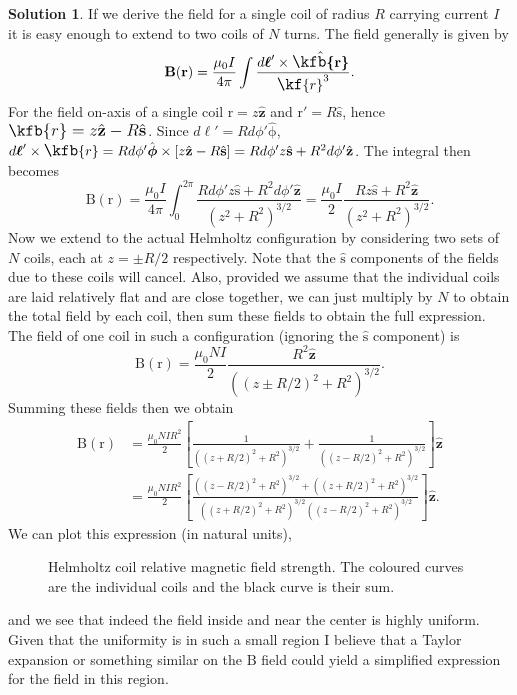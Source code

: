 \documentclass[10pt]{article}
\theoremstyle{definition}
\newtheorem{soln}{Solution}
\newcommand{\uz}{\hat{\mathbf{z}}}
\newcommand{\uv}[1]{\hat{\bv{{#1}}}}
\newcommand{\scriptr}{\fontsize{12pt}{12pt}\kf{r}}
\newcommand{\bscriptr}{\fontsize{12pt}{12pt}\kfb{r}}
\newcommand{\bv}[1]{\bm{\mathrm{#1}}}
\begin{document}
\begin{soln}
  If we derive the field for a single coil of radius $R$ carrying current $I$ it is easy enough to extend to two coils of $N$ turns.
  The field generally is given by
  $$\bv{B}(\bv{r})=\frac{\mu_0 I}{4\pi}\int \frac{d\bv{\ell}'\times\uv{\bscriptr}}{\scriptr^3}.$$
  For the field on-axis of a single coil $\bv{r}=z\uz$ and $\bv{r}'=R\uv{s}$, hence $\bscriptr = z\uz-R\uv{s}$.
  Since $d\bv{\ell}'=Rd\phi'\uv{\phi}$, $d\bv{\ell}'\times {\bscriptr}=Rd\phi'\uv{\phi}\times\left[z\uz-R\uv{s}\right]=
    Rd\phi'z\uv{s}+R^2d\phi'\uz$. The integral then becomes
  $$\bv{B}(\bv{r})=\frac{\mu_0 I}{4\pi}\int_0^{2\pi} \frac{Rd\phi'z\uv{s}+R^2d\phi'\uz}{\left(z^2+R^2\right)^{3/2}}=\frac{\mu_0 I}{2}\frac{Rz\uv{s}+R^2\uz}{\left(z^2+R^2\right)^{3/2}}.$$
  Now we extend to the actual Helmholtz configuration by considering two sets of $N$ coils, each at $z=\pm R/2$ respectively. Note that the $\uv{s}$ components of the
  fields due to these coils will cancel. Also, provided we assume that the individual coils are laid relatively flat and are close together, we can just multiply by $N$
  to obtain the total field by each coil, then sum these fields to obtain the full expression. The field of one coil in such a configuration (ignoring the $\uv{s}$ component) is
  $$\bv{B}(\bv{r})=\frac{\mu_0 NI}{2}\frac{R^2\uz}{\left((z\pm R/2)^2+R^2\right)^{3/2}}.$$
  Summing these fields then we obtain
  \begin{align*}
    \bv{B}(\bv{r}) & =\frac{\mu_0 NIR^2}{2}\left[\frac{1}{\left((z+ R/2)^2+R^2\right)^{3/2}}+\frac{1}{\left((z-R/2)^2+R^2\right)^{3/2}}\right]\uz                                                         \\
                   & =\frac{\mu_0 NIR^2}{2}\left[\frac{\left((z-R/2)^2+R^2\right)^{3/2}+\left((z+ R/2)^2+R^2\right)^{3/2}}{\left((z+ R/2)^2+R^2\right)^{3/2}\left((z- R/2)^2+R^2\right)^{3/2}}\right]\uz.
  \end{align*}
  We can plot this expression (in natural units),
\begin{figure}[h]
  \centering
    \caption{Helmholtz coil relative magnetic field strength. The coloured curves are the individual coils and the black curve is their sum.}
\end{figure}
and we see that indeed the field inside and near the center is highly uniform. Given that the uniformity is in such a small region I believe that 
a Taylor expansion or something similar on the $\bv{B}$ field could yield a simplified expression for the field in this region.
\end{soln}
\end{document}
